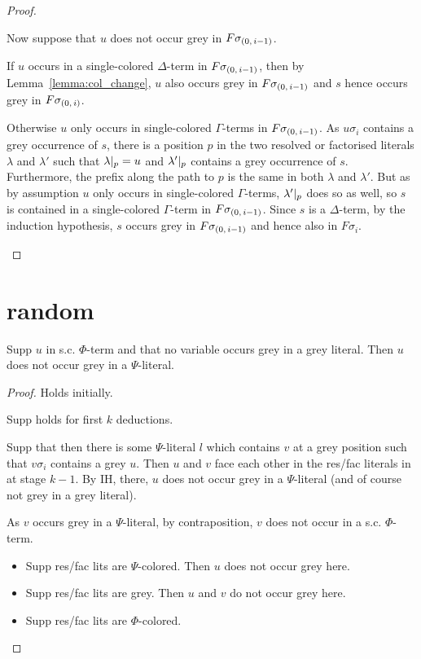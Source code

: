 \documentclass[,%
	draft=false,%
	numbers=noendperiod
	12pt,
	a4paper,
	oneside,%
	openany,
]{memoir}
\begin{document}
\begin{proof}
\begin{itemize}
			Now suppose that $u$ does not occur grey in $F\sigma_{(0,\,i-1)}$.

			If $u$ occurs in a single-colored $\Delta$-term in $F\sigma_{(0,\,i-1)}$, then by Lemma~\ref{lemma:col_change}, $u$ also occurs grey in $F\sigma_{(0,\,i-1)}$ and $s$ hence occurs grey in $F\sigma_{(0,\,i)}$. 

			Otherwise $u$ only occurs in single-colored $\Gamma$-terms in $F\sigma_{(0,\,i-1)}$. 
			As $u\sigma_i$ contains a grey occurrence of $s$, there is a position $p$ in the two resolved or factorised literals $\lambda$ and $\lambda'$ such that $\lambda|_{p} = u$ and $\lambda'|_{p}$ contains a grey occurrence of $s$.
			Furthermore, the prefix along the path to $p$ is the same in both $\lambda$ and $\lambda'$.
			But as by assumption $u$ only occurs in single-colored $\Gamma$-terms, $\lambda'|_{p}$ does so as well, so $s$ is contained in a single-colored $\Gamma$-term in $F\sigma_{(0,\,i-1)}$.
			Since $s$ is a $\Delta$-term, by the induction hypothesis, $s$ occurs grey in $F\sigma_{(0,\,i-1)}$ and hence also in $F\sigma_i$.
			\qedhere
	\end{itemize}

\end{proof}

\clearpage
\section{random}

\begin{clemma}
	Supp $u$ in s.c. $\Phi$-term and that  no variable occurs grey in a grey literal.
	Then $u$ does not occur grey in a $\Psi$-literal.
\end{clemma}
\begin{proof}
	Holds initially.

	Supp holds for first $k$ deductions.

	Supp that then there is some $\Psi$-literal $l$ which contains $v$ at a grey position such that $v\sigma_i$ contains a grey $u$.
	Then $u$ and $v$ face each other in the res/fac literals in at stage $k-1$.
	By IH, there, $u$ does not occur grey in a $\Psi$-literal (and of course not grey in a grey literal). 

	As $v$ occurs grey in a $\Psi$-literal, by contraposition, $v$ does not occur in a s.c. $\Phi$-term.

	\begin{itemize}
		\item
			Supp res/fac lits are $\Psi$-colored.
			Then $u$ does not occur grey here.

			\mytodo{}

		\item
			Supp res/fac lits are grey.
			Then $u$ and $v$ do not occur grey here.
			\mytodo{}

		\item
			Supp res/fac lits are $\Phi$-colored.
			\mytodo{}
	\end{itemize}




\end{proof}
\end{document}
